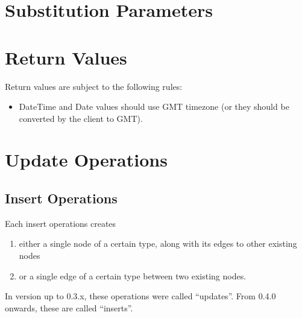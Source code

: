\section{Substitution Parameters}
\label{sec:substitution-parameters}




\section{Return Values}
\label{sec:return-values}

Return values are subject to the following rules:

\begin{itemize}
	\item \textsf{DateTime} and \textsf{Date} values should use GMT timezone (or they should be converted by the client to GMT).
\end{itemize}


\section{Update Operations}
\label{sec:update-operations}

\subsection{Insert Operations}
\label{sec:insert-operations}

Each insert operations creates

\begin{enumerate}
    \item either a single node of a certain type, along with its edges to other existing nodes
    \item or a single edge of a certain type between two existing nodes.
\end{enumerate}
In version up to 0.3.x, these operations were called ``updates''.
From 0.4.0 onwards, these are called ``inserts''.

